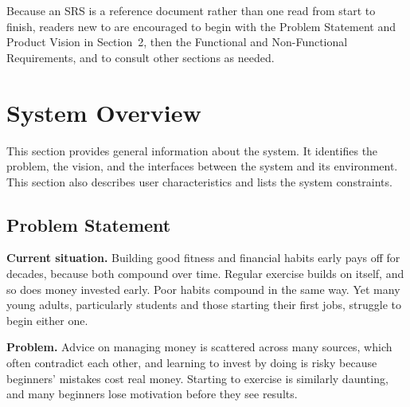 \documentclass[12pt]{article}
\begin{document}
Because an SRS is a reference document rather than one read from start to
finish, readers new to \progname{} are encouraged to begin with the Problem
Statement and Product Vision in Section~2, then the Functional and
Non-Functional Requirements, and to consult other sections as needed.

\section{System Overview}

This section provides general information about the system.  It identifies the
problem, the vision, and the interfaces between the system and its environment.
This section also describes user characteristics and lists the system
constraints.


\subsection{Problem Statement}


\textbf{Current situation.} Building good fitness and financial habits early
pays off for decades, because both compound over time. Regular exercise builds
on itself, and so does money invested early. Poor habits compound in the same
way. Yet many young adults, particularly students and those starting their
first jobs, struggle to begin either one.

\textbf{Problem.} Advice on managing money is scattered across many sources,
which often contradict each other, and learning to invest by doing is risky
because beginners' mistakes cost real money. Starting to exercise is similarly
daunting, and many beginners lose motivation before they see results.
\end{document}
